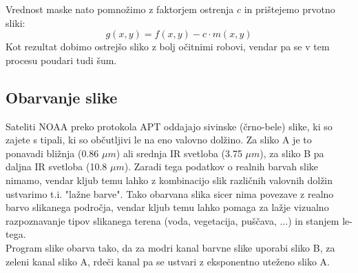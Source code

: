 \documentclass[a4paper, twocolumn]{article}
\begin{document}
Vrednost maske nato pomnožimo z faktorjem ostrenja $c$ in prištejemo prvotno sliki:
\begin{equation}
g(x,y)=f(x,y)-c \cdot m(x,y)
\end{equation}
Kot rezultat dobimo ostrejšo sliko z bolj očitnimi robovi, vendar pa se v tem procesu poudari tudi šum.

\subsection{Obarvanje slike}
Sateliti NOAA preko protokola APT oddajajo sivinske (črno-bele) slike, ki so zajete s tipali, ki so občutljivi le na eno valovno dolžino. Za sliko A je to ponavadi bližnja (0.86 $\mu m$) ali srednja IR svetloba (3.75 $\mu m$), za sliko B pa daljna IR svetloba (10.8 $\mu m$). Zaradi tega podatkov o realnih barvah slike nimamo, vendar kljub temu lahko z kombinacijo slik različnih valovnih  dolžin ustvarimo t.i. "lažne barve". Tako obarvana slika sicer nima povezave z realno barvo slikanega področja, vendar kljub temu lahko pomaga za lažje vizualno razpoznavanje tipov slikanega terena (voda, vegetacija, puščava, ...) in stanjem le-tega.\\
Program slike obarva tako, da za modri kanal barvne slike uporabi sliko B, za zeleni kanal sliko A, rdeči kanal pa se ustvari z eksponentno uteženo sliko A.
\end{document}
